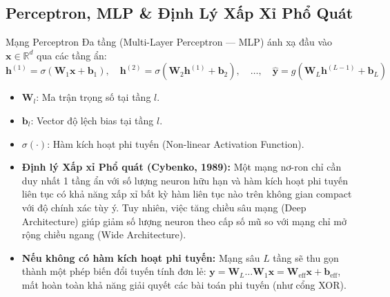 \documentclass[10pt,a4paper]{article}
\begin{document}
\subsection{Perceptron, MLP \& Định Lý Xấp Xỉ Phổ Quát}
Mạng Perceptron Đa tầng (Multi-Layer Perceptron --- MLP) ánh xạ đầu vào $\mathbf{x} \in \mathbb{R}^d$ qua các tầng ẩn:
\begin{equation}
    \mathbf{h}^{(1)} = \sigma(\mathbf{W}_1 \mathbf{x} + \mathbf{b}_1), \quad \mathbf{h}^{(2)} = \sigma(\mathbf{W}_2 \mathbf{h}^{(1)} + \mathbf{b}_2), \quad \dots, \quad \hat{\mathbf{y}} = g(\mathbf{W}_L \mathbf{h}^{(L-1)} + \mathbf{b}_L)
\end{equation}
\begin{itemize}[leftmargin=*]
    \item $\mathbf{W}_l$: Ma trận trọng số tại tầng $l$.
    \item $\mathbf{b}_l$: Vector độ lệch bias tại tầng $l$.
    \item $\sigma(\cdot)$: Hàm kích hoạt phi tuyến (Non-linear Activation Function).
    \item \textbf{Định lý Xấp xỉ Phổ quát (Cybenko, 1989):} Một mạng nơ-ron chỉ cần duy nhất 1 tầng ẩn với số lượng neuron hữu hạn và hàm kích hoạt phi tuyến liên tục có khả năng xấp xỉ bất kỳ hàm liên tục nào trên không gian compact với độ chính xác tùy ý. Tuy nhiên, việc tăng chiều sâu mạng (Deep Architecture) giúp giảm số lượng neuron theo cấp số mũ so với mạng chỉ mở rộng chiều ngang (Wide Architecture).
    \item \textbf{Nếu không có hàm kích hoạt phi tuyến:} Mạng sâu $L$ tầng sẽ thu gọn thành một phép biến đổi tuyến tính đơn lẻ: $\mathbf{y} = \mathbf{W}_L \dots \mathbf{W}_1 \mathbf{x} = \mathbf{W}_{\text{eff}} \mathbf{x} + \mathbf{b}_{\text{eff}}$, mất hoàn toàn khả năng giải quyết các bài toán phi tuyến (như cổng XOR).
\end{itemize}
\end{document}
